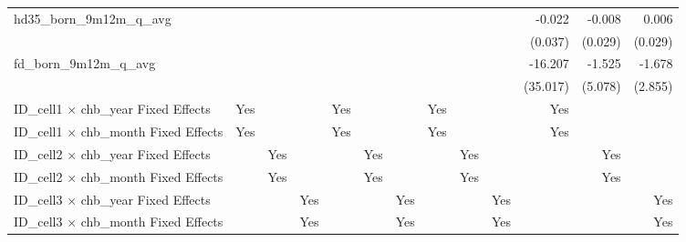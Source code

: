 \begin{tabular}{lrrrrrrrrrrrr}
hd35\_born\_9m12m\_q\_avg                   &              &              &              &              &              &              &              &              &              &       -0.022 &       -0.008 &        0.006 \\ 
                                            &              &              &              &              &              &              &              &              &              &      (0.037) &      (0.029) &      (0.029) \\ 
fd\_born\_9m12m\_q\_avg                     &              &              &              &              &              &              &              &              &              &      -16.207 &       -1.525 &       -1.678 \\ 
                                            &              &              &              &              &              &              &              &              &              &     (35.017) &      (5.078) &      (2.855) \\ 
\midrule
ID\_cell1 $\times$ chb\_year Fixed Effects  &          Yes &              &              &          Yes &              &              &          Yes &              &              &          Yes &              &              \\ 
ID\_cell1 $\times$ chb\_month Fixed Effects &          Yes &              &              &          Yes &              &              &          Yes &              &              &          Yes &              &              \\ 
ID\_cell2 $\times$ chb\_year Fixed Effects  &              &          Yes &              &              &          Yes &              &              &          Yes &              &              &          Yes &              \\ 
ID\_cell2 $\times$ chb\_month Fixed Effects &              &          Yes &              &              &          Yes &              &              &          Yes &              &              &          Yes &              \\ 
ID\_cell3 $\times$ chb\_year Fixed Effects  &              &              &          Yes &              &              &          Yes &              &              &          Yes &              &              &          Yes \\ 
ID\_cell3 $\times$ chb\_month Fixed Effects &              &              &          Yes &              &              &          Yes &              &              &          Yes &              &              &          Yes \\ 

\end{tabular}
